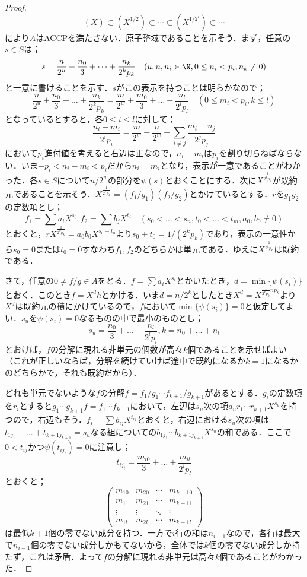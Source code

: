 \begin{proof}
	\[(X)\subset(X^{1/2})\subset\cdots\subset(X^{1/2^i})\subset\cdots\]
	により$A$はACCPを満たさない．原子整域であることを示そう．まず，任意の$s\in S$は；
	\[s=\frac{n}{2^u}+\frac{n_0}{3}+\dots+\frac{n_k}{2^kp_k}\quad(u,n,n_i\in\N, 0\leq n_i<p_i,n_k\neq0)\]
	と一意に書けることを示す．$s$がこの表示を持つことは明らかなので；
	\[\frac{n}{2^u}+\frac{n_0}{3}+\dots+\frac{n_k}{2^kp_k}=\frac{m}{2^w}+\frac{m_0}{3}+\dots+\frac{n_l}{2^lp_l}\quad(0\leq m_i<p_i, k\leq l)\]
	となっているとすると，各$0\leq i\leq l$に対して；
	\[\frac{n_i-m_i}{2^ip_i}=\frac{m}{2^w}-\frac{n}{2^w}+\sum_{i\neq j}\frac{m_i-n_j}{2^jp_j}\]
	において$p_i$進付値を考えると右辺は正なので，$n_i-m_i$は$p_i$を割り切らねばならない．いま$-p_i<n_i-m_i<p_i$だから$n_i=m_i$となり，表示が一意であることがわかった．各$s\in S$について$n/2^w$の部分を$\psi(s)$とおくことにする．次に$X^{\frac{1}{2^kp_k}}$が既約元であることを示そう．$X^{\frac{1}{2^kp_k}}=(f_1/g_1)(f_2/g_2)$とかけているとする．$r$を$g_1g_2$の定数項とし；
	\[f_1=\sum a_iX^{s_i}, f_2=\sum b_jX^{t_j}\quad(s_0<\dots< s_n, t_0<\dots<t_m, a_0,b_0\neq 0)\]
	とおくと，$rX^{\frac{1}{2^kp_k}}=a_0b_0X^{s_0+t_0}$より$s_0+t_0=1/(2^kp_k)$であり，表示の一意性から$s_0=0$または$t_0=0$すなわち$f_1,f_2$のどちらかは単元である．ゆえに$X^{\frac{1}{2^kp_k}}$は既約である．
	
	さて，任意の$0\neq f/g\in A$をとる．$f=\sum a_iX^{s_i}$とかいたとき，$d=\min\{\psi(s_i)\}$とおく．このとき$f=X^dh$とかける．いま$d=n/2^k$としたとき$X^d=X^{\frac{1}{2^kp_k}np_k}$より$X^d$は既約元の積にかけているので，$f$において$\min\{\psi(s_i)\}=0$と仮定してよい．$s_u$を$\psi(s_i)=0$なるものの中で最小のものとし；
	\[s_u=\frac{n_0}{3}+\dots+\frac{n_l}{2^lp_l}, k=n_0+\dots+n_l\]
	とおけば，$f$の分解に現れる非単元の個数が高々$k$個であることを示せばよい（これが正しいならば，分解を続けていけば途中で既約になるか$k=1$になるかのどちらかで，それも既約だから）．
	
	どれも単元でないような$f$の分解$f=f_1/g_1\cdots f_{k+1}/g_{k+1}$があるとする．$g_i$の定数項を$r_i$とすると$g_1\cdots g_{k+1}f=f_1\cdots f_{k+1}$において，左辺は$s_u$次の項$a_ur_1\cdots r_{k+1}X^{s_u}$を持つので，右辺もそう．$f_i=\sum b_{ij}X^{t_{ij}}$とおくと，右辺における$s_u$次の項は$t_{1j_1}+\dots+t_{k+1 j_{k+1}}=s_u$なる組についての$b_{1j_1}\cdots b_{k+1 j_{k+1}}X^{s_u}$の和である．ここで$0<t_{ij}$かつ$\psi(t_{ij_i})=0$に注意し；
	\[t_{ij_i}=\frac{m_{i0}}{3}+\dots+\frac{m_{il}}{2^lp_l}\]
	とおくと；
	\[\begin{pmatrix}
		m_{10}&m_{20}&\cdots&m_{k+1 0}\\
		m_{11}&m_{21}&\cdots&m_{k+1 1}\\
		\vdots&\vdots&\ddots&\vdots\\
		m_{1l}&m_{2l}&\cdots&m_{k+1 l}
	\end{pmatrix}\]
	は最低$k+1$個の零でない成分を持つ．一方で$i$行の和は$n_{i-1}$なので，各行は最大で$n_{i-1}$個の零でない成分しかもてないから，全体では$k$個の零でない成分しか持たず，これは矛盾．よって$f$の分解に現れる非単元は高々$k$個であることがわかった．
\end{proof}
